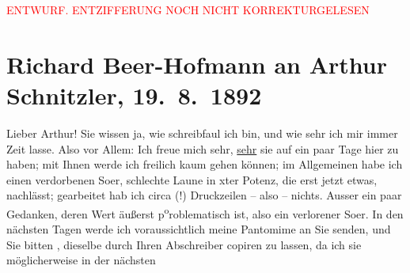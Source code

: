 
\begin{center}
            \textcolor{red}{ENTWURF. ENTZIFFERUNG NOCH NICHT KORREKTURGELESEN}
                      \end{center}
            
               \section[Richard Beer-Hofmann an Arthur Schnitzler, 19. 8. 1892]{ Richard Beer-Hofmann an Arthur Schnitzler, 19. 8. 1892}\nopagebreak{}\rehead{ }\begin{ledgroupsized}[t]{13cm}\normalsize\beginnumbering{} \toendnotes[C]{\smallbreak\pagebreak[2]} 
\toendnotes[C]{\smallbreak}\pstart
           \noindent{}{\pb}Lieber Arthur! Sie wissen ja, wie schreibfaul ich bin, und wie sehr
               ich mir immer Zeit lasse.\pend
           \pstart
           Also vor Allem: Ich freue mich sehr, \uline{sehr} sie auf ein
               paar Tage hier zu haben; mit Ihnen {\pb}werde ich freilich kaum gehen können; im Allgemeinen habe ich einen verdorbenen
                  So{\geminationm}er, schlechte Laune in xter Potenz, die erst jetzt
               etwas, nachlässt; gearbeitet {\pb}hab
               ich circa  (!) Druckzeilen – also – nichts. Ausser
               ein paar Gedanken, deren Wert äußerst p\substVorne{}\textsuperscript{o}\substDazwischen{}ro\substHinten{}blematisch ist, also ein verlorener So{\geminationm}er. In
               den nächsten {\pb}Tagen werde ich
               voraussichtlich meine Pantomime an Sie senden, und Sie bitten ,
               dieselbe durch Ihren Abschreiber copiren zu lassen, da ich sie möglicherweise in der nächsten

\end{ledgroupsized}

